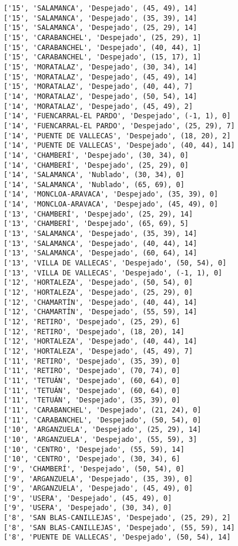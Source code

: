 \documentclass[11pt]{article}
\begin{document}
\begin{Verbatim}[commandchars=\\\{\}]
['15', 'SALAMANCA', 'Despejado', (45, 49), 14]
['15', 'SALAMANCA', 'Despejado', (35, 39), 14]
['15', 'SALAMANCA', 'Despejado', (25, 29), 14]
['15', 'CARABANCHEL', 'Despejado', (25, 29), 1]
['15', 'CARABANCHEL', 'Despejado', (40, 44), 1]
['15', 'CARABANCHEL', 'Despejado', (15, 17), 1]
['15', 'MORATALAZ', 'Despejado', (30, 34), 14]
['15', 'MORATALAZ', 'Despejado', (45, 49), 14]
['15', 'MORATALAZ', 'Despejado', (40, 44), 7]
['14', 'MORATALAZ', 'Despejado', (50, 54), 14]
['14', 'MORATALAZ', 'Despejado', (45, 49), 2]
['14', 'FUENCARRAL-EL PARDO', 'Despejado', (-1, 1), 0]
['14', 'FUENCARRAL-EL PARDO', 'Despejado', (25, 29), 7]
['14', 'PUENTE DE VALLECAS', 'Despejado', (18, 20), 2]
['14', 'PUENTE DE VALLECAS', 'Despejado', (40, 44), 14]
['14', 'CHAMBERÍ', 'Despejado', (30, 34), 0]
['14', 'CHAMBERÍ', 'Despejado', (25, 29), 0]
['14', 'SALAMANCA', 'Nublado', (30, 34), 0]
['14', 'SALAMANCA', 'Nublado', (65, 69), 0]
['14', 'MONCLOA-ARAVACA', 'Despejado', (35, 39), 0]
['14', 'MONCLOA-ARAVACA', 'Despejado', (45, 49), 0]
['13', 'CHAMBERÍ', 'Despejado', (25, 29), 14]
['13', 'CHAMBERÍ', 'Despejado', (65, 69), 5]
['13', 'SALAMANCA', 'Despejado', (35, 39), 14]
['13', 'SALAMANCA', 'Despejado', (40, 44), 14]
['13', 'SALAMANCA', 'Despejado', (60, 64), 14]
['13', 'VILLA DE VALLECAS', 'Despejado', (50, 54), 0]
['13', 'VILLA DE VALLECAS', 'Despejado', (-1, 1), 0]
['12', 'HORTALEZA', 'Despejado', (50, 54), 0]
['12', 'HORTALEZA', 'Despejado', (25, 29), 0]
['12', 'CHAMARTÍN', 'Despejado', (40, 44), 14]
['12', 'CHAMARTÍN', 'Despejado', (55, 59), 14]
['12', 'RETIRO', 'Despejado', (25, 29), 6]
['12', 'RETIRO', 'Despejado', (18, 20), 14]
['12', 'HORTALEZA', 'Despejado', (40, 44), 14]
['12', 'HORTALEZA', 'Despejado', (45, 49), 7]
['11', 'RETIRO', 'Despejado', (35, 39), 0]
['11', 'RETIRO', 'Despejado', (70, 74), 0]
['11', 'TETUÁN', 'Despejado', (60, 64), 0]
['11', 'TETUÁN', 'Despejado', (60, 64), 0]
['11', 'TETUÁN', 'Despejado', (35, 39), 0]
['11', 'CARABANCHEL', 'Despejado', (21, 24), 0]
['11', 'CARABANCHEL', 'Despejado', (50, 54), 0]
['10', 'ARGANZUELA', 'Despejado', (25, 29), 14]
['10', 'ARGANZUELA', 'Despejado', (55, 59), 3]
['10', 'CENTRO', 'Despejado', (55, 59), 14]
['10', 'CENTRO', 'Despejado', (30, 34), 6]
['9', 'CHAMBERÍ', 'Despejado', (50, 54), 0]
['9', 'ARGANZUELA', 'Despejado', (35, 39), 0]
['9', 'ARGANZUELA', 'Despejado', (45, 49), 0]
['9', 'USERA', 'Despejado', (45, 49), 0]
['9', 'USERA', 'Despejado', (30, 34), 0]
['8', 'SAN BLAS-CANILLEJAS', 'Despejado', (25, 29), 2]
['8', 'SAN BLAS-CANILLEJAS', 'Despejado', (55, 59), 14]
['8', 'PUENTE DE VALLECAS', 'Despejado', (50, 54), 14]

\end{Verbatim}
\end{document}
